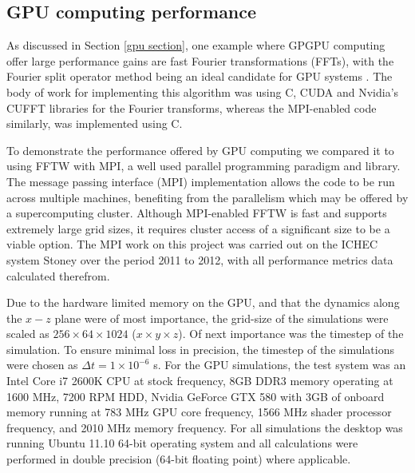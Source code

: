 

\subsection{GPU computing performance}

As discussed in Section \ref{gpu section}, one example where GPGPU computing offer large performance gains are fast Fourier transformations (FFTs), with the Fourier split operator method being an ideal candidate for GPU systems \cite{Bauke:11}. The body of work for implementing this algorithm was using C, CUDA and Nvidia's CUFFT libraries for the Fourier transforms, whereas the MPI-enabled code similarly, was implemented using C.

To demonstrate the performance offered by GPU computing we compared it to using FFTW with MPI, a well used parallel programming paradigm and library. The message passing interface (MPI) implementation allows the code to be run across multiple machines, benefiting from the parallelism which may be offered by a supercomputing cluster. Although MPI-enabled FFTW is fast and supports extremely large grid sizes, it requires cluster access of a significant size to be a viable option. The MPI work on this project was carried out on the ICHEC system Stoney over the period 2011 to 2012, with all performance metrics data calculated therefrom.



Due to the hardware limited memory on the GPU, and that the dynamics along the $x-z$ plane were of most importance, the grid-size of the simulations were scaled as $256\times 64\times1024$ ($x\times y\times z$). Of next importance was the timestep of the simulation.  To ensure minimal loss in precision, the timestep of the simulations were chosen as $\Delta t = 1\times 10^{-6}$ s. For the GPU simulations, the test system was an Intel Core i7 2600K CPU at stock frequency, 8GB DDR3 memory operating at 1600 MHz, 7200 RPM HDD, Nvidia GeForce GTX 580 with 3GB of onboard memory running at 783 MHz GPU core frequency, 1566 MHz shader processor frequency, and 2010 MHz memory frequency. For all simulations the desktop was running Ubuntu 11.10 64-bit operating system and all calculations were performed in double precision (64-bit floating point) where applicable.

